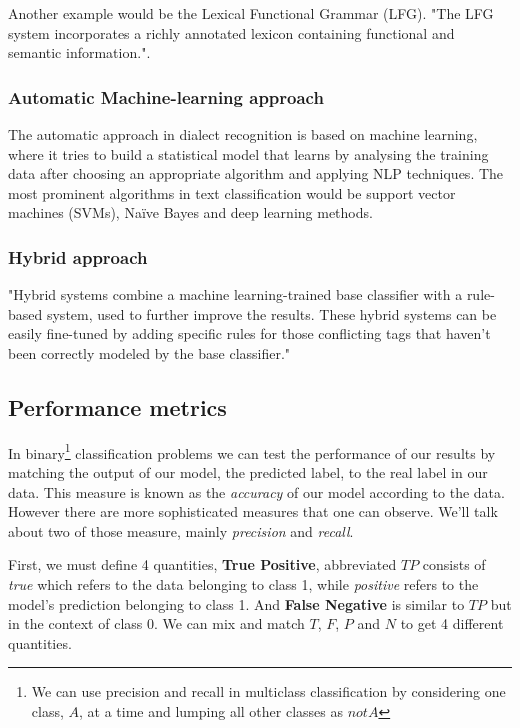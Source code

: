 \documentclass[12pt]{diazessay}
\begin{document}
        Another example would be the Lexical Functional Grammar (LFG). "The LFG system incorporates a richly annotated lexicon containing functional and semantic information."\cite{hassan_2010}.

        
        \subsubsection{Automatic Machine-learning approach} \label{txt:simple_voting}
        The automatic approach in dialect recognition is based on machine learning, where it tries to build a statistical model that learns by analysing the training data after choosing an appropriate algorithm and applying NLP techniques. The most prominent algorithms in text classification would be support vector machines (SVMs), Naïve Bayes and deep learning methods.
        
        
        \subsubsection{Hybrid approach}
        "Hybrid systems combine a machine learning-trained base classifier with a rule-based system, used to further improve the results. These hybrid systems can be easily fine-tuned by adding specific rules for those conflicting tags that haven’t been correctly modeled by the base classifier."\cite{monkey_learn_NLP}
        
        
    \subsection{Performance metrics}
    In binary\footnote{We can use precision and recall in multiclass classification by considering one class, \(A\), at a time and lumping all other classes as \(not A\)} classification problems we can test the performance of our results by matching the output of our model, the predicted label, to the real label in our data. This measure is known as the \emph{accuracy} of our model according to the data. However there are more sophisticated measures that one can observe. We'll talk about two of those measure, mainly \emph{precision} and \emph{recall}.
    
    First, we must define 4 quantities, \textbf{True Positive}, abbreviated \(TP\) consists of \emph{true} which refers to the data belonging to class 1, while \emph{positive} refers to the model's prediction belonging to class 1. And \textbf{False Negative} is similar to \(TP\) but in the context of class 0. We can mix and match \(T\), \(F\), \(P\) and \(N\) to get 4 different quantities.
    
\end{document}
